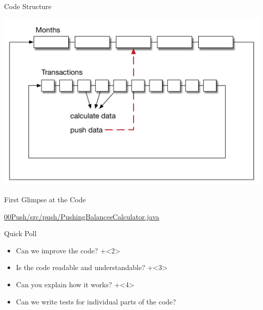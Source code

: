 \begin{frame}[fragile]{Code Structure}

\includegraphics[width=\textwidth]{CodeMechanics.pdf}

\end{frame}

\begin{frame}[fragile]{First Glimpse at the Code}

\begin{center}
{\large \url{00Push/src/push/PushingBalancesCalculator.java}}
\end{center}
\end{frame}

\begin{frame}[fragile]{Quick Poll}

\begin{itemize}
\onslide+<1>
\item Can we improve the code?
\onslide+<2>
\item Is the code readable and understandable?
\onslide+<3>
\item Can you explain how it works?
\onslide+<4>
\item Can we write tests for individual parts of the code?
\end{itemize}

\end{frame}

